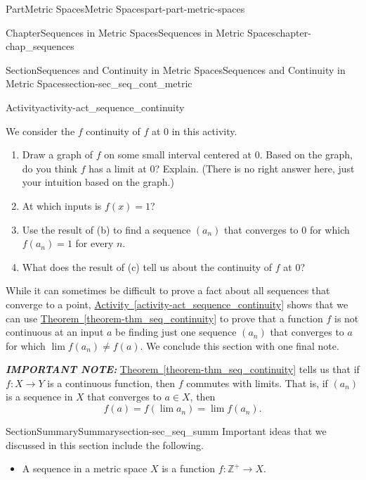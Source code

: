 \documentclass[oneside,10pt,]{book}
\newcommand{\xreffont}{\relax}
\newcommand{\alert}[1]{\textbf{\textit{#1}}}
\numberwithin{equation}{chapter}
\newcommand{\Z}{\mathbb{Z}}
\begin{document}
\begin{partptx}{Part}{Metric Spaces}{}{Metric Spaces}{}{}{part-part-metric-spaces}
\begin{chapterptx}{Chapter}{Sequences in Metric Spaces}{}{Sequences in Metric Spaces}{}{}{chapter-chap_sequences}
\begin{sectionptx}{Section}{Sequences and Continuity in Metric Spaces}{}{Sequences and Continuity in Metric Spaces}{}{}{section-sec_seq_cont_metric}
\begin{activity}{Activity}{}{activity-act_sequence_continuity}
\begin{equation*}
\end{equation*}
%
\par
We consider the \(f\) continuity of \(f\) at \(0\) in this activity.%
\begin{enumerate}[font=\bfseries,label=(\alph*),ref=\alph*]%
\item{}Draw a graph of \(f\) on some small interval centered at \(0\). Based on the graph, do you think \(f\) has a limit at \(0\)? Explain. (There is no right answer here, just your intuition based on the graph.)%
\item{}At which inputs is \(f(x)=1\)?%
\item{}Use the result of (b) to find a sequence \((a_n)\) that converges to \(0\) for which \(f(a_n) = 1\) for every \(n\).%
\item{}What does the result of (c) tell us about the continuity of \(f\) at \(0\)?%
\end{enumerate}%
\end{activity}%
While it can sometimes be difficult to prove a fact about all sequences that converge to a point, \hyperref[activity-act_sequence_continuity]{Activity~{\xreffont\ref{activity-act_sequence_continuity}}} shows that we can use \hyperref[theorem-thm_seq_continuity]{Theorem~{\xreffont\ref{theorem-thm_seq_continuity}}} to prove that a function \(f\) is not continuous at an input \(a\) be finding just one sequence \((a_n)\) that converges to \(a\) for which \(\lim f(a_n) \neq f(a)\). We conclude this section with one final note.%
\par
\alert{IMPORTANT NOTE:} \hyperref[theorem-thm_seq_continuity]{Theorem~{\xreffont\ref{theorem-thm_seq_continuity}}} tells us that if \(f : X \to Y\) is a continuous function, then \(f\) commutes with limits. That is, if \((a_n)\) is a sequence in \(X\) that converges to \(a \in X\), then%
\begin{equation*}
f(a) = f(\lim a_n) = \lim f(a_n)\text{.}
\end{equation*}
%
\end{sectionptx}
%
%
\typeout{************************************************}
\typeout{************************************************}
%
\begin{sectionptx}{Section}{Summary}{}{Summary}{}{}{section-sec_seq_summ}
Important ideas that we discussed in this section include the following.%
\begin{itemize}[label=\textbullet]
\item{}A sequence in a metric space \(X\) is a function \(f : \Z^+ \to X\).%

\end{itemize}
\end{sectionptx}
\end{chapterptx}
\end{partptx}
\end{document}

